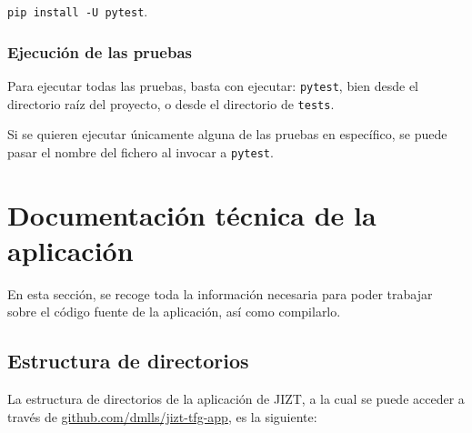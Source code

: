\texttt{pip install -U pytest}.

\subsubsection{Ejecución de las pruebas}

Para ejecutar todas las pruebas, basta con ejecutar: \texttt{pytest}, bien desde el directorio raíz del proyecto, o desde el directorio de \texttt{tests}.

Si se quieren ejecutar únicamente alguna de las pruebas en específico, se puede pasar el nombre del fichero al invocar a \texttt{pytest}.

\section{Documentación técnica de la aplicación}

En esta sección, se recoge toda la información necesaria para poder trabajar sobre el código fuente de la aplicación, así como compilarlo.


\subsection{Estructura de directorios}

La estructura de directorios de la aplicación de JIZT, a la cual se puede acceder a través de \href{https://github.com/dmlls/jizt-tfg-app}{github.com/dmlls/jizt-tfg-app}, es la siguiente:

